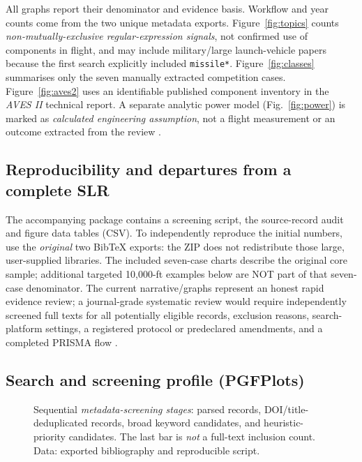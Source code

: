 \documentclass[10pt,a4paper]{article}
\begin{document}
All graphs report their denominator and evidence basis. Workflow and year counts come from the two unique metadata exports. Figure~\ref{fig:topics} counts \emph{non-mutually-exclusive regular-expression signals}, not confirmed use of components in flight, and may include military/large launch-vehicle papers because the first search explicitly included \texttt{missile*}. Figure~\ref{fig:classes} summarises only the seven manually extracted competition cases. Figure~\ref{fig:aves2} uses an identifiable published component inventory in the \emph{AVES II} technical report. A separate analytic power model (Fig.~\ref{fig:power}) is marked as \emph{calculated engineering assumption}, not a flight measurement or an outcome extracted from the review \cite{astg2022aves2,rpicopico,rtc2027rules}.

\subsection{Reproducibility and departures from a complete SLR}
The accompanying package contains a screening script, the source-record audit and figure data tables (CSV). To independently reproduce the initial numbers, use the \emph{original} two BibTeX exports: the ZIP does not redistribute those large, user-supplied libraries. The included seven-case charts describe the original core sample; additional targeted 10,000-ft examples below are NOT part of that seven-case denominator. The current narrative/graphs represent an honest rapid evidence review; a journal-grade systematic review would require independently screened full texts for all potentially eligible records, exclusion reasons, search-platform settings, a registered protocol or predeclared amendments, and a completed PRISMA flow \cite{page2021,rethlefsen2021}.

\subsection{Search and screening profile (PGFPlots)}
\begin{figure}[htbp]\centering
{}
\caption{Sequential \emph{metadata-screening stages}: parsed records, DOI/title-deduplicated records, broad keyword candidates, and heuristic-priority candidates. The last bar is \emph{not} a full-text inclusion count. Data: exported bibliography and reproducible script.}
\label{fig:screening}
\end{figure}
\end{document}
